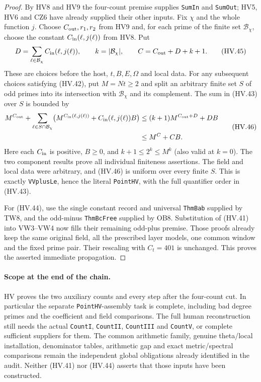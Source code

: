 \begin{proof}
By HV8 and HV9 the four-count premise supplies \texttt{SumIn}
and \texttt{SumOut}; HV5, HV6 and CZ6 have already supplied
their other inputs.  Fix $\chi$ and the whole function $j$.
Choose $C_{\rm out},r_1,r_2$ from HV9 and, for each prime
of the finite set $\mathcal B_\chi$, choose the constant
$C_{\rm in}(\ell,j(\ell))$ from HV8.  Put
\[
 D=\sum_{\ell\in\mathcal B_\chi}C_{\rm in}(\ell,j(\ell)),
 \qquad k=|\mathcal B_\chi|,
 \qquad C=C_{\rm out}+D+k+1.
 \tag{HV.45}
\]
These are choices before the host, $t,B,E,\Omega$ and local
data.  For any subsequent choices satisfying (HV.42), put
$M=Nt\ge2$ and split an arbitrary finite set $S$ of odd primes
into its intersection with $\mathcal B_\chi$ and its complement.
The sum in (HV.43) over $S$ is bounded by
\[
 \begin{split}
 M^{C_{\rm out}}+
 \sum_{\ell\in S\cap\mathcal B_\chi}
       \bigl(M^{C_{\rm in}(\ell,j(\ell))}
                          +C_{\rm in}(\ell,j(\ell))B\bigr)
 &\le (k+1)M^{C_{\rm out}+D}+DB\\
 &\le M^C+CB.
 \end{split}
 \tag{HV.46}
\]
Here each $C_{\rm in}$ is positive, $B\ge0$, and
$k+1\le2^k\le M^k$ (also valid at $k=0$).
The two component results prove all individual finiteness
assertions.  The field and local data were arbitrary,
and (HV.46) is uniform over every finite $S$.
This is exactly \texttt{VVplusLe}, hence the literal
\texttt{PointHV}, with the full quantifier order in (HV.43).

For (HV.44), use the single constant record and universal
\texttt{ThmBab} supplied by TW8, and the odd-minus
\texttt{ThmBcFree} supplied by OB8.  Substitution of (HV.41)
into VW3--VW4 now fills their remaining odd-plus premise.
Those proofs already keep the same original field, all the
prescribed layer models, one common window and the fixed
prime pair.  Their rescaling with $C_t=401$ is unchanged.
This proves the asserted immediate propagation.
\end{proof}

\paragraph{Scope at the end of the chain.}
HV proves the two auxiliary counts and every step after the
four-count cut.  In particular the separate
\texttt{PointHV}-assembly task is complete, including bad
degree primes and the coefficient and field comparisons.
The full human reconstruction still needs the actual
\texttt{CountI}, \texttt{CountII}, \texttt{CountIII} and
\texttt{CountV}, or complete sufficient suppliers for them.
The common arithmetic family, genuine theta/local installation,
denominator tables, arithmetic gap and exact metric/spectral
comparisons remain the independent global obligations already
identified in the audit.  Neither (HV.41) nor (HV.44) asserts
that those inputs have been constructed.
